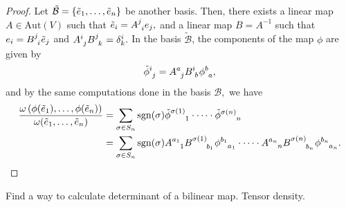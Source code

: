 \begin{proof}
    Let \(\tilde{\mathcal{B}} = \{\tilde{e}_1, \dots, \tilde{e}_n\}\) be another basis. Then, there exists a linear map \(A \in \mathrm{Aut}(V)\) such that \(\tilde{e}_i = A\indices{^j_i}e_j,\) and a linear map \(B = A^{-1}\) such that \(e_i = B\indices{^j_i}\tilde{e}_j\) and \(A\indices{^i_j}B\indices{^j_k} = \delta^i_k.\) In the basis \(\tilde{\mathcal{B}}\), the components of the map \(\phi\) are given by
    \begin{equation*}
        \tilde{\phi}\indices{^i_j} = A\indices{^a_j}B\indices{^i_b}\phi\indices{^b_a},
    \end{equation*}
    and by the same computations done in the basis \(\mathcal{B},\) we have
    \begin{align*}
        \frac{\omega\left(\phi(\tilde{e}_1), \dots, \phi(\tilde{e}_n)\right)}{\omega(\tilde{e}_1, \dots, \tilde{e}_n)} &= \sum_{\sigma \in S_n} \sgn(\sigma) \tilde{\phi}\indices{^{\sigma(1)}_{1}} \cdot \dots \cdot \tilde{\phi}\indices{^{\sigma(n)}_{n}}\\
                                                                                                                               &= \sum_{\sigma \in S_n} \sgn(\sigma) A\indices{^{a_1}_1}B\indices{^{\sigma(1)}_{b_1}}\phi\indices{^{b_1}_{a_1}}
                                                                                                                           \cdot \dots \cdot A\indices{^{a_n}_n}B\indices{^{\sigma(n)}_{b_n}}\phi\indices{^{b_n}_{a_n}}.
    \end{align*}
    \todo
\end{proof}

Find a way to calculate determinant of a bilinear map. Tensor density.


